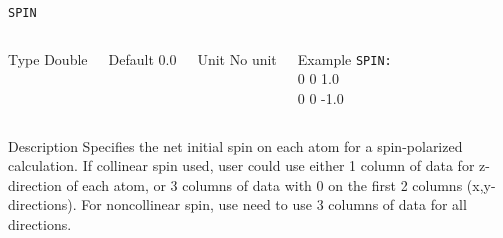 \begin{frame}[allowframebreaks]{\texttt{SPIN}} \label{SPIN}
\vspace*{-12pt}
\begin{columns}
\begin{block}{Type}
Double
\end{block}

\begin{block}{Default}
0.0
\end{block}

\begin{block}{Unit}
No unit
\end{block}

\begin{block}{Example}
\texttt{SPIN: \\}
0 0 1.0 \\
0 0 -1.0
\end{block}
\end{columns}

\begin{block}{Description}
Specifies the net initial spin on each atom for a spin-polarized calculation. If collinear spin used, user could use either 1 column of data for z-direction of each atom, or 3 columns of data with 0 on the first 2 columns (x,y-directions). For noncollinear spin, use need to use 3 columns of data for all directions. 
\end{block}

\end{frame}
